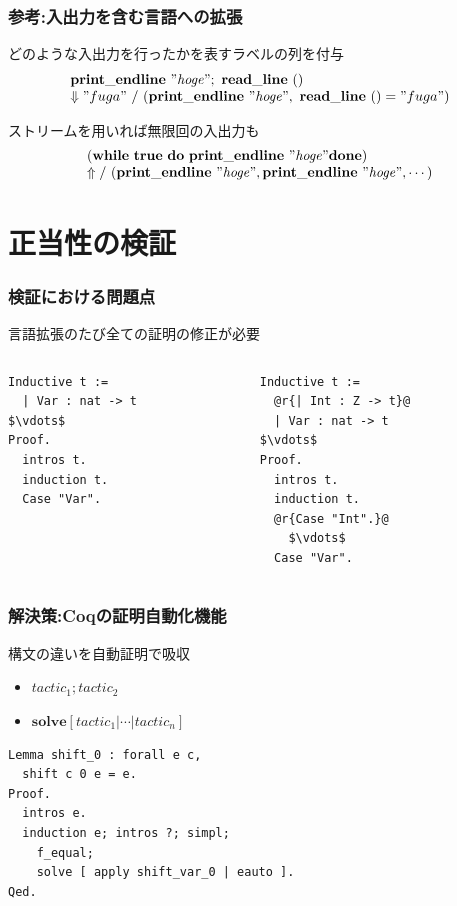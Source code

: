 \documentclass[dvipdfmx,cjk,xcolor=dvipsnames,envcountsect,notheorems,12pt]{beamer}
\theoremstyle{definition}
\newcommand{\keyword}[1]{\mathbf{#1}}
\newcommand{\TRUE}{\keyword{true}}
\newcommand{\WHILE}{\keyword{while}}
\newcommand{\DO}{\keyword{do}}
\newcommand{\DONE}{\keyword{done}}
\begin{document}
\begin{frame}
	\frametitle{参考:入出力を含む言語への拡張}
	\Large どのような入出力を行ったかを表すラベルの列を付与
	{\normalsize \[
			\begin{array}{l}
				\keyword{print\_endline}~\mathit{"hoge"};~\keyword{read\_line}~()\\
				\Downarrow "fuga"~/~(\keyword{print\_endline}~\mathit{"hoge"},~\keyword{read\_line}~()="fuga")
			\end{array}
	\]}

	ストリームを用いれば無限回の入出力も
	{\normalsize \[
		\begin{array}{l}
			(\WHILE~\TRUE~\DO~\keyword{print\_endline}~\mathit{"hoge"}\DONE) \\
			\Uparrow /~(\keyword{print\_endline}~\mathit{"hoge"}, \keyword{print\_endline}~\mathit{"hoge"}, \cdots)
		\end{array}
	\]}
\end{frame}


\section{正当性の検証}

\begin{frame}[fragile]
	\frametitle{検証における問題点}
	\Large 言語拡張のたび全ての証明の修正が必要
	\begin{columns}
		\begin{column}{0.5\textwidth}
\begin{lstlisting}[frame=none]
Inductive t :=
  | Var : nat -> t
$\vdots$
Proof.
  intros t.
  induction t.
  Case "Var".
\end{lstlisting}
		\end{column}
		\begin{column}{0.5\textwidth}
\begin{lstlisting}[frame=none]
Inductive t :=
  @r{| Int : Z -> t}@
  | Var : nat -> t
$\vdots$
Proof.
  intros t.
  induction t.
  @r{Case "Int".}@
    $\vdots$
  Case "Var".
\end{lstlisting}
		\end{column}
	\end{columns}
\end{frame}

\begin{frame}[fragile]
	\frametitle{解決策:Coqの証明自動化機能}
	\LARGE 構文の違いを自動証明で吸収
	\begin{center}
		\footnotesize
		\begin{itemize}
			\item $\mathit{tactic}_1;\mathit{tactic}_2$
			\item $\keyword{solve} [\mathit{tactic}_1 | \cdots | \mathit{tactic}_n]$
		\end{itemize}
	\end{center}

	\vfill

\begin{lstlisting}[]
Lemma shift_0 : forall e c,
  shift c 0 e = e.
Proof.
  intros e.
  induction e; intros ?; simpl;
    f_equal;
    solve [ apply shift_var_0 | eauto ].
Qed.
\end{lstlisting}
\end{frame}
\end{document}
